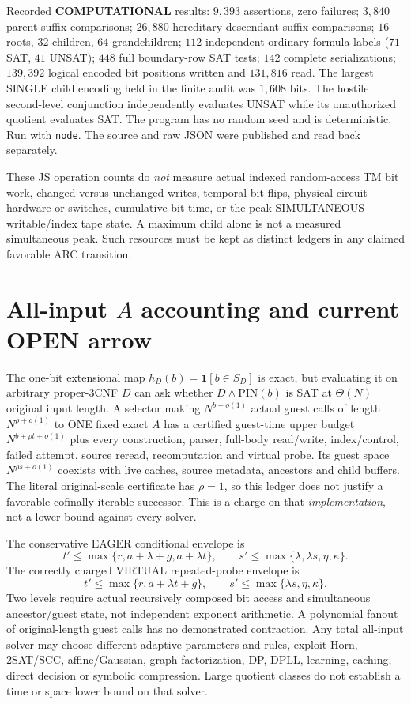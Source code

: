 \documentclass[11pt]{article}
\begin{document}
Recorded \textbf{COMPUTATIONAL} results:
$9,393$ assertions, zero failures;
$3,840$ parent-suffix comparisons;
$26,880$ hereditary descendant-suffix
comparisons; $16$ roots, $32$ children,
$64$ grandchildren; $112$ independent
ordinary formula labels ($71$ SAT, $41$ UNSAT);
$448$ full boundary-row SAT tests;
$142$ complete serializations;
$139,392$ logical encoded bit positions
written and $131,816$ read.
The largest SINGLE child encoding held in
the finite audit was $1,608$ bits.
The hostile second-level conjunction
independently evaluates UNSAT while
its unauthorized quotient evaluates SAT.
The program has no random seed and is
deterministic. Run with \texttt{node}.
The source and raw JSON were published and
read back separately.

These JS operation counts do \emph{not}
measure actual indexed random-access TM
bit work, changed versus unchanged writes,
temporal bit flips, physical circuit hardware
or switches, cumulative bit-time, or the
peak SIMULTANEOUS writable/index tape
state. A maximum child alone is not
a measured simultaneous peak. Such resources
must be kept as distinct ledgers in any
claimed favorable ARC transition.

\section{All-input $A$ accounting and current OPEN arrow}
The one-bit extensional map $h_D(b)=
\mathbf1[b\in S_D]$ is exact, but evaluating
it on arbitrary proper-3CNF $D$ can ask whether
$D\land\mathrm{PIN}(b)$ is SAT at
$\Theta(N)$ original input length.
A selector making $N^{b+o(1)}$ actual
guest calls of length $N^{\rho+o(1)}$ to
ONE fixed exact $A$ has a certified
guest-time upper budget $N^{b+\rho t+o(1)}$
plus every construction, parser, full-body
read/write, index/control, failed attempt,
source reread, recomputation and virtual
probe. Its guest space $N^{\rho s+o(1)}$
coexists with live caches, source metadata,
ancestors and child buffers. The literal
original-scale certificate has $\rho=1$,
so this ledger does not justify a
favorable cofinally iterable successor.
This is a charge on that \emph{implementation},
not a lower bound against every solver.

The conservative EAGER conditional envelope is
\[
 t'\le\max\{r,a+\lambda+g,a+\lambda t\},\qquad
 s'\le\max\{\lambda,\lambda s,\eta,\kappa\}.
\]
The correctly charged VIRTUAL repeated-probe
envelope is
\[
 t'\le\max\{r,a+\lambda t+g\},\qquad
 s'\le\max\{\lambda s,\eta,\kappa\}.
\]
Two levels require actual recursively
composed bit access and simultaneous
ancestor/guest state, not independent
exponent arithmetic. A polynomial fanout
of original-length guest calls has no
demonstrated contraction. Any total
all-input solver may choose different
adaptive parameters and rules, exploit
Horn, 2SAT/SCC, affine/Gaussian, graph
factorization, DP, DPLL, learning,
caching, direct decision or symbolic
compression. Large quotient classes
do not establish a time or space
lower bound on that solver.
\end{document}
